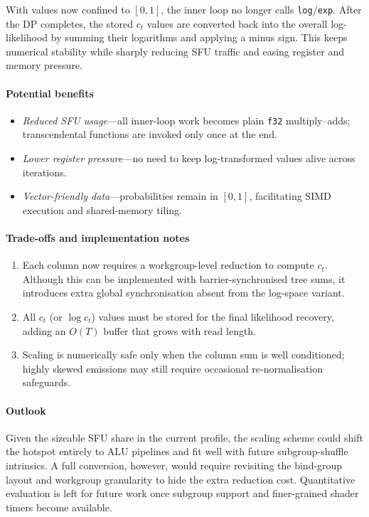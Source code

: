 \documentclass[PhD]{PHlab-thesis}
\begin{document}
With values now confined to $[0,1]$, the inner loop no longer calls \texttt{log}/\texttt{exp}.  
After the DP completes, the stored $c_{t}$ values are converted back into the overall log-likelihood by summing their logarithms and applying a minus sign.  
This keeps numerical stability while sharply reducing SFU traffic and easing register and memory pressure.

\paragraph{Potential benefits}
\begin{itemize}
  \item \emph{Reduced SFU usage}—all inner-loop work becomes plain \texttt{f32} multiply–adds; transcendental functions are invoked only once at the end.
  \item \emph{Lower register pressure}—no need to keep log-transformed values alive across iterations.
  \item \emph{Vector-friendly data}—probabilities remain in $[0,1]$, facilitating SIMD execution and shared-memory tiling.
\end{itemize}

\paragraph{Trade-offs and implementation notes}
\begin{enumerate}
  \item Each column now requires a workgroup-level reduction to compute $c_{t}$.  
        Although this can be implemented with barrier-synchronised tree sums, it introduces extra global synchronisation absent from the log-space variant.
  \item All $c_{t}$ (or $\log c_{t}$) values must be stored for the final likelihood recovery, adding an $O(T)$ buffer that grows with read length.
  \item Scaling is numerically safe only when the column sum is well conditioned; highly skewed emissions may still require occasional re-normalisation safeguards.
\end{enumerate}

\paragraph{Outlook}
Given the sizeable SFU share in the current profile, the scaling scheme could shift the hotspot entirely to ALU pipelines and fit well with future subgroup-shuffle intrinsics.  
A full conversion, however, would require revisiting the bind-group layout and workgroup granularity to hide the extra reduction cost.  
Quantitative evaluation is left for future work once subgroup support and finer-grained shader timers become available.
\end{document}

